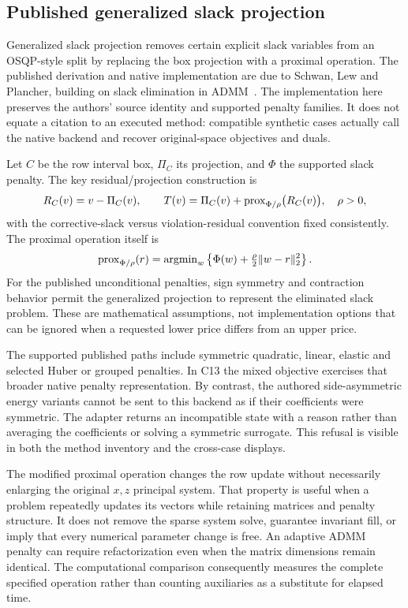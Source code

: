 \subsection{Published generalized slack projection}\label{sec:gsp}
Generalized slack projection removes certain explicit slack variables from an
OSQP-style split by replacing the box projection with a proximal operation. The
published derivation and native implementation are due to Schwan, Lew and
Plancher, building on slack elimination in ADMM~\cite{gsp,lew}. The implementation
here preserves the authors' source identity and supported penalty families. It
does not equate a citation to an executed method: compatible synthetic cases
actually call the native backend and recover original-space objectives and duals.

Let $C$ be the row interval box, $\Pi_C$ its projection, and $\Phi$ the supported
slack penalty. The key residual/projection construction is
\begin{equation}\label{eq:gsp-residual}
 R_C(v)=v-\Pi_C(v),\qquad
 T(v)=\Pi_C(v)+\operatorname{prox}_{\Phi/\rho}\bigl(R_C(v)\bigr),\quad \rho>0,
\end{equation}
with the corrective-slack versus violation-residual convention fixed consistently.
The proximal operation itself is
\begin{equation}\label{eq:gsp-prox}
 \operatorname{prox}_{\Phi/\rho}(r)=\operatorname{argmin}_w\left\{\Phi(w)+\tfrac\rho2\|w-r\|_2^2\right\}.
\end{equation}
For the published unconditional penalties, sign symmetry and contraction behavior
permit the generalized projection to represent the eliminated slack problem.
These are mathematical assumptions, not implementation options that can be
ignored when a requested lower price differs from an upper price.

The supported published paths include symmetric quadratic, linear, elastic and
selected Huber or grouped penalties. In C13 the mixed objective exercises that
broader native penalty representation. By contrast, the authored side-asymmetric
energy variants cannot be sent to this backend as if their coefficients were
symmetric. The adapter returns an incompatible state with a reason rather than
averaging the coefficients or solving a symmetric surrogate. This refusal is
visible in both the method inventory and the cross-case displays.

The modified proximal operation changes the row update without necessarily
enlarging the original $x,z$ principal system. That property is useful when a
problem repeatedly updates its vectors while retaining matrices and penalty
structure. It does not remove the sparse system solve, guarantee invariant fill,
or imply that every numerical parameter change is free. An adaptive ADMM penalty
can require refactorization even when the matrix dimensions remain identical.
The computational comparison consequently measures the complete specified
operation rather than counting auxiliaries as a substitute for elapsed time.

